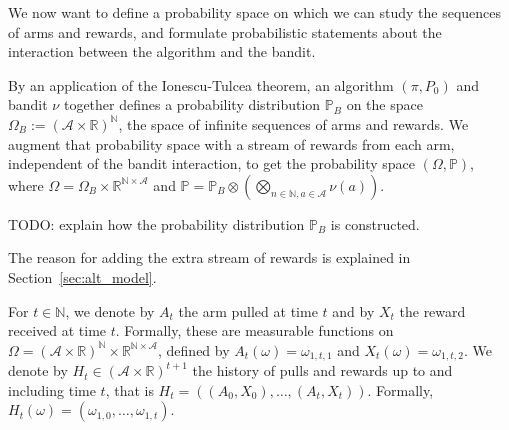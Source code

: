 We now want to define a probability space on which we can study the sequences of arms and rewards, and formulate probabilistic statements about the interaction between the algorithm and the bandit.


\begin{definition}\label{def:Bandit.measure}
  \leanok
By an application of the Ionescu-Tulcea theorem, an algorithm $(\pi, P_0)$ and bandit $\nu$ together defines a probability distribution $\mathbb{P}_B$ on the space $\Omega_B := (\mathcal{A} \times \mathbb{R})^{\mathbb{N}}$, the space of infinite sequences of arms and rewards.
We augment that probability space with a stream of rewards from each arm, independent of the bandit interaction, to get the probability space $(\Omega, \mathbb{P})$, where $\Omega = \Omega_B \times \mathbb{R}^{\mathbb{N} \times \mathcal{A}}$ and $\mathbb{P} = \mathbb{P}_B \otimes (\bigotimes_{n \in \mathbb{N}, a \in \mathcal{A}} \nu(a))$.

TODO: explain how the probability distribution $\mathbb{P}_B$ is constructed.
\end{definition}

The reason for adding the extra stream of rewards is explained in Section~\ref{sec:alt_model}.

\begin{definition}\label{def:armAndReward}
  \leanok
For $t \in \mathbb{N}$, we denote by $A_t$ the arm pulled at time $t$ and by $X_t$ the reward received at time $t$.
Formally, these are measurable functions on $\Omega = (\mathcal{A} \times \mathbb{R})^{\mathbb{N}} \times \mathbb{R}^{\mathbb{N} \times \mathcal{A}}$, defined by $A_t(\omega) = \omega_{1,t,1}$ and $X_t(\omega) = \omega_{1,t,2}$.
We denote by $H_t \in (\mathcal{A} \times \mathbb{R})^{t+1}$ the history of pulls and rewards up to and including time $t$, that is $H_t = ((A_0, X_0), \ldots, (A_t, X_t))$.
Formally, $H_t(\omega) = (\omega_{1,0}, \ldots, \omega_{1,t})$.
\end{definition}



